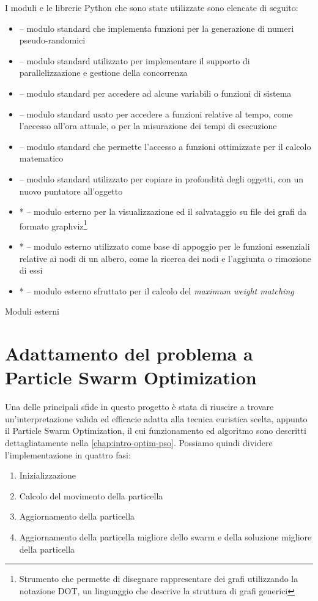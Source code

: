 I moduli e le librerie Python che sono state utilizzate sono elencate di seguito: \begin{itemize}
  \item {} -- modulo standard che implementa funzioni per la generazione di numeri pseudo-randomici
  \item {} -- modulo standard utilizzato per implementare il supporto di parallelizzazione e gestione della concorrenza
  \item {} -- modulo standard per accedere ad alcune variabili o funzioni di sistema
  \item {} -- modulo standard usato per accedere a funzioni relative al tempo, come l'accesso all'ora attuale, o per la misurazione dei tempi di esecuzione
  \item {} -- modulo standard che permette l'accesso a funzioni ottimizzate per il calcolo matematico
  \item {} -- modulo standard utilizzato per copiare in profondità degli oggetti, con un nuovo puntatore all'oggetto
  \item *  -- modulo esterno per la visualizzazione ed il salvataggio su file dei grafi da formato graphviz\footnote{Strumento che permette di disegnare rappresentare dei grafi utilizzando la notazione DOT, un linguaggio che descrive la struttura di grafi generici}
  \item *  -- modulo esterno utilizzato come base di appoggio per le funzioni essenziali relative ai nodi di un albero, come la ricerca dei nodi e l'aggiunta o rimozione di essi
  \item *  -- modulo esterno sfruttato per il calcolo del \textit{maximum weight matching}
\end{itemize}

\small * Moduli esterni

\section{Adattamento del problema a Particle Swarm Optimization}
\label{chap:pso-adapt}
Una delle principali sfide in questo progetto è stata di riuscire a trovare un'interpretazione valida ed efficacie adatta alla tecnica euristica scelta, appunto il Particle Swarm Optimization, il cui funzionamento ed algoritmo sono descritti dettagliatamente nella \autoref{chap:intro-optim-pso}. Possiamo quindi dividere l'implementazione in quattro fasi: \begin{enumerate}
  \item Inizializzazione
  \item Calcolo del movimento della particella
  \item Aggiornamento della particella
  \item Aggiornamento della particella migliore dello swarm e della soluzione migliore della particella
\end{enumerate}

